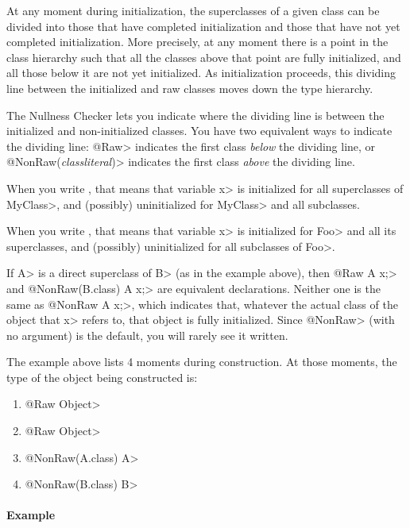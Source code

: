 At any moment during initialization, the superclasses of a given class
can be divided into those that have completed initialization and those that
have not yet completed initialization.  More precisely, at any moment there
is a point in the class hierarchy such that all the classes above that
point are fully initialized, and all those below it are not yet
initialized.  As initialization proceeds, this dividing line between the
initialized and raw classes moves down the type hierarchy.

The Nullness Checker lets you indicate where the dividing line is between
the initialized and non-initialized classes.
You have two equivalent ways to indicate the dividing line:  \<@Raw>
indicates the first class \emph{below} the dividing line, or
\<@NonRaw(\emph{classliteral})> indicates the first class \emph{above} the
dividing line.

When you write , that
means that variable \<x> is initialized for all superclasses of \<MyClass>,
and (possibly) uninitialized for \<MyClass> and all subclasses.

When you write , that means that variable \<x> is initialized for \<Foo> and all its
superclasses, and (possibly) uninitialized for all subclasses of \<Foo>.

If \<A> is a direct superclass of \<B> (as in the example above), then
\<@Raw A x;> and \<@NonRaw(B.class) A x;> are equivalent declarations.
Neither one is the same as \<@NonRaw A x;>, which indicates that, whatever
the actual class of the object that \<x> refers to, that object is fully
initialized.  Since \<@NonRaw> (with no argument) is the default, you will
rarely see it written.

The example above lists 4 moments during construction.  At those moments,
the type of the object being constructed is:

\begin{enumerate}
\item
  \<@Raw Object>
\item
  \<@Raw Object>
\item
  \<@NonRaw(A.class) A>
\item
  \<@NonRaw(B.class) B>
\end{enumerate}

\paragraph{Example\label{rawness-partial-initialization-example}}

